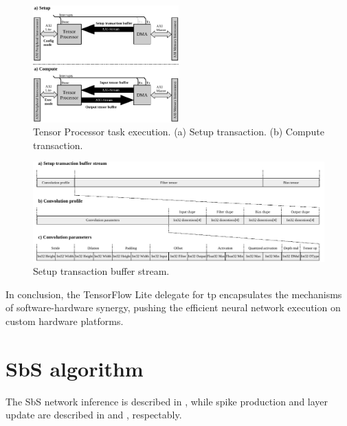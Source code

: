 \begin{figure}[h!]
	\centering
	\includegraphics[width=0.5\textwidth]{./figures/task_execution.pdf}
	\caption{Tensor Processor task execution. (a) Setup transaction. (b) Compute transaction.}
	\label{fig:sw_tp_delegate_job}
\end{figure}

\begin{figure}[h!]
	\centering
	\includegraphics[width=\textwidth]{./figures/setup_transaction_buffer_stream.pdf}
	\caption{Setup transaction buffer stream.}
	\label{fig:setup_transaction}
\end{figure}

In conclusion, the TensorFlow Lite delegate for \gls{tp} encapsulates the mechanisms of software-hardware synergy, pushing the efficient neural network execution on custom hardware platforms.

\FloatBarrier
\section{SbS algorithm}
\label{chap:appendix}
The SbS network inference is described in , while spike production and layer update are described in  and , respectably.

